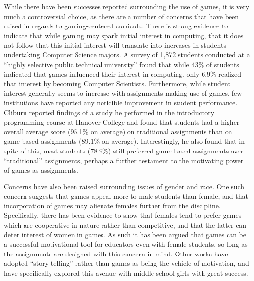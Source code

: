 
While there have been successes reported surrounding the use of games, it is very much a controversial choice, as there are a number of concerns that have been raised in regards to gaming-centered curricula.  There is strong evidence to indicate that while gaming may spark initial interest in computing, that it does not follow that this initial interest will translate into increases in students undertaking Computer Science majors.  A survey of 1,872 students conducted at a ``highly selective public technical university'' found that while 43\% of students indicated that games influenced their interest in computing, only 6.9\% realized that interest by becoming Computer Scientists\cite{DiSalvo09}.  Furthermore, while student interest generally seems to increase with assignments making use of games, few institutions have reported any noticible improvement in student performance.  Cliburn reported findings of a study he performed in the introductory programming course at Hanover College and found that students had a higher overall average score (95.1\% on average) on traditional assignments than on game-based assignments (89.1\% on average)\cite{Cliburn06}.  Interestingly, he also found that in spite of this, most students (78.9\%) still preferred game-based assignments over ``traditional'' assignments, perhaps a further testament to the motivating power of games as assignments.

Concerns have also been raised surrounding issues of gender and race.  One such concern suggests that games appeal more to male students than female, and that incorporation of games may alienate females further from the discipline.  Specifically, there has been evidence to show that females tend to prefer games which are cooperative in nature rather than competitive, and that the latter can deter interest of women in games\cite{Camp02}.  As such it has been argued that games can be a successful motivational tool for educators even with female students, so long as the assignments are designed with this concern in mind\cite{Carmichael08}.  Other works have adopted ``story-telling'' rather than games as being the vehicle of motivation, and have specifically explored this avenue with middle-school girls with great success\cite{Kelleher06}.

\begin{comment}
\cite{Natvig04,Barnes08} example of games being used
Some ideas about why creativity is important can be found in \cite{Farooq06}.
Games as a motivational tool: see ``International Conference on Game Development in Computer Science Education''.
An excellent outline of how games can be used successfully in CS curricula as well as how not only should we shoehorn games but also focus on fundamentals is summarized in \cite{Bayliss09}.  It also discusses what considerations should be made when incorporating games into courses.
\end{comment}
